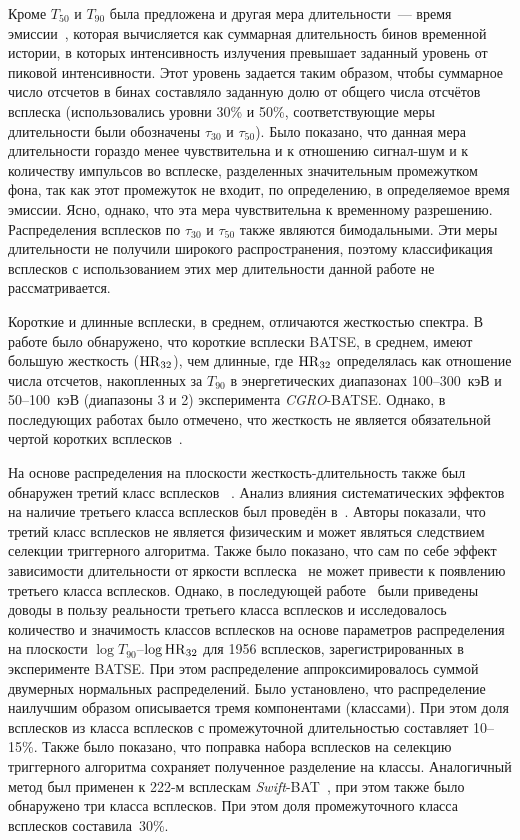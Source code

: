 Кроме $T_{50}$ и $T_{90}$ была предложена и другая мера длительности~--- время 
эмиссии~\citep{Mitrofanov_1999}, которая вычисляется как суммарная длительность 
бинов временной истории, в которых интенсивность излучения превышает заданный 
уровень от пиковой интенсивности. Этот уровень задается таким образом, чтобы 
суммарное число отсчетов в бинах составляло заданную долю от общего числа отсчётов 
всплеска (использовались уровни 30\% и 50\%, соответствующие меры длительности 
были обозначены $\tau_{30}$ и $\tau_{50}$). Было показано, что данная мера 
длительности гораздо менее чувствительна и к отношению сигнал-шум и к количеству 
импульсов во всплеске, разделенных значительным промежутком фона, так как этот 
промежуток не входит, по определению, в определяемое время эмиссии. Ясно, однако, 
что эта мера чувствительна к временному разрешению. Распределения всплесков 
по $\tau_{30}$ и $\tau_{50}$  также являются бимодальными. Эти меры длительности 
не получили широкого распространения, поэтому классификация всплесков 
с использованием этих мер длительности данной работе не рассматривается. 

Короткие и длинные всплески, в среднем, отличаются жесткостью спектра.
В работе \citep{Kouveliotou_1993} было обнаружено, что короткие всплески BATSE, в 
среднем, имеют большую жесткость (${\mathrm{HR}}_{32}$), чем длинные, где ${\mathrm{HR}}_{32}$ определялась 
как отношение числа отсчетов, накопленных за $T_{90}$ в энергетических 
диапазонах 100--300~кэВ и 50--100~кэВ (диапазоны 3 и 2) эксперимента \textit{CGRO}-BATSE. 
Однако, в последующих работах было отмечено, что жесткость не является обязательной чертой 
коротких всплесков~\citep[см. например][]{Sakamoto_2006_proc, Norris_and_Bonnel_2006ApJ}. 

На основе распределения на плоскости жесткость-длительность также был обнаружен 
третий класс всплесков ~\citep{Mukherjee_1998, Hakkila_2000}. Анализ влияния 
систематических эффектов на наличие третьего класса всплесков был проведён 
в~\citep{Hakkila_2003}. Авторы показали, что третий класс всплесков не является 
физическим и может являться следствием селекции триггерного алгоритма. Также было 
показано, что сам по себе эффект зависимости длительности от яркости 
всплеска~\citep{Bonnell_1997} не может привести к появлению третьего класса всплесков. 
Однако, в последующей работе~\citep{Horvath_2006} были приведены доводы в пользу 
реальности третьего класса всплесков и исследовалось количество и значимость 
классов всплесков на основе параметров распределения на плоскости 
$\log T_{90}$--$\log {\mathrm{HR}}_{32}$ для 1956 всплесков, зарегистрированных 
в эксперименте BATSE. При этом распределение аппроксимировалось 
суммой двумерных нормальных распределений. Было установлено, что распределение 
наилучшим образом описывается тремя компонентами (классами). При этом доля всплесков 
из класса всплесков с промежуточной длительностью составляет 10--15\%. Также было показано, что поправка набора 
всплесков на селекцию триггерного алгоритма сохраняет полученное разделение на классы. 
Аналогичный метод был применен к 222-м всплескам \textit{Swift}-BAT~\citep{Horvath_2010}, 
при этом также было обнаружено три класса всплесков. При этом доля промежуточного 
класса всплесков составила~30\%.

